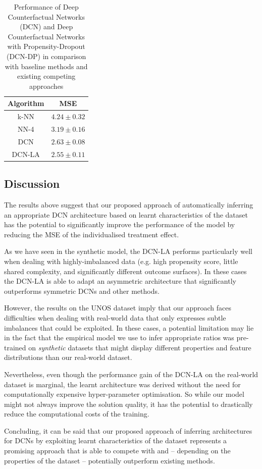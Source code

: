 \begin{table}[h]
	\centering
	\begin{tabular}{@{}cc@{}}
		\toprule
		\textbf{Algorithm} & \textbf{MSE}                \\ \midrule
		k-NN               &   $4.24 \pm 0.32$           \\
		NN-4                &  $3.19 \pm 0.16$           \\
		DCN                &   $2.63 \pm 0.08$           \\
		DCN-LA             &   $2.55 \pm 0.11$          \\\bottomrule
	\end{tabular}
	\caption{Performance of Deep Counterfactual Networks (DCN) and Deep Counterfactual Networks with Propensity-Dropout (DCN-DP) in comparison with baseline methods and existing competing approaches}\label{tab:dcn-la-results}
\end{table}

\subsection{Discussion}
The results above suggest that our proposed approach of automatically inferring an appropriate DCN architecture based on learnt characteristics of the dataset has the potential to significantly improve the performance of the model by reducing the MSE of the individualised treatment effect. 

As we have seen in the synthetic model, the DCN-LA performs particularly well when dealing with highly-imbalanced data (e.g. high propensity score, little shared complexity, and significantly different outcome surfaces). In these cases the DCN-LA is able to adapt an asymmetric architecture that significantly outperforms symmetric DCNs and other methods. 

However, the results on the UNOS dataset imply that our approach faces difficulties when dealing with real-world data that only expresses subtle imbalances that could be exploited. In these cases, a potential limitation may lie in the fact that the empirical model we use to infer appropriate ratios was pre-trained on \emph{synthetic} datasets that might display different properties and feature distributions than our real-world dataset. 

Nevertheless, even though the performance gain of the DCN-LA on the real-world dataset is marginal, the learnt architecture was derived without the need for computationally expensive hyper-parameter optimisation. So while our model might not always improve the solution quality, it has the potential to drastically reduce the computational costs of the training. 

Concluding, it can be said that our proposed approach of inferring architectures for DCNs by exploiting learnt characteristics of the dataset represents a promising approach that is able to compete with and -- depending on the properties of the dataset -- potentially outperform existing methods. 
